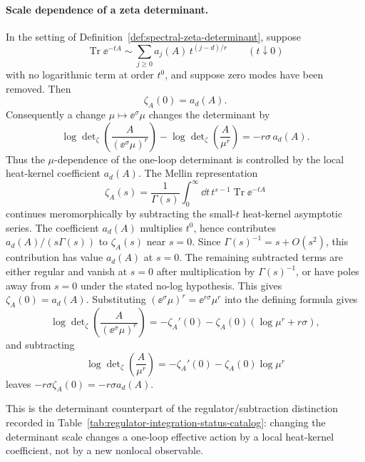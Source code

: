 \paragraph{Scale dependence of a zeta determinant.}
In the setting of Definition~\ref{def:spectral-zeta-determinant}, suppose
\[
  \operatorname{Tr}\ee^{-tA}
  \sim
  \sum_{j\ge0} a_j(A)\,t^{(j-d)/r}
  \qquad (t\downarrow0)
\]
with no logarithmic term at order \(t^0\), and suppose zero modes have been
removed.  Then
\[
  \zeta_A(0)=a_d(A).
\]
Consequently a change \(\mu\mapsto \ee^\sigma\mu\) changes the determinant by
\[
  \log\det\nolimits_\zeta\!\left(\frac{A}{(\ee^\sigma\mu)^r}\right)
  -
  \log\det\nolimits_\zeta\!\left(\frac{A}{\mu^r}\right)
  =
  -r\sigma\,a_d(A).
\]
Thus the \(\mu\)-dependence of the one-loop determinant is controlled by the
local heat-kernel coefficient \(a_d(A)\).
The Mellin representation
\[
  \zeta_A(s)=\frac1{\Gamma(s)}
  \int_0^\infty \dd t\,t^{s-1}\operatorname{Tr}\ee^{-tA}
\]
continues meromorphically by subtracting the small-\(t\) heat-kernel
asymptotic series.  The coefficient \(a_d(A)\) multiplies \(t^0\), hence
contributes \(a_d(A)/(s\Gamma(s))\) to \(\zeta_A(s)\) near \(s=0\).  Since
\(\Gamma(s)^{-1}=s+O(s^2)\), this contribution has value \(a_d(A)\) at
\(s=0\).  The remaining subtracted terms are either regular and vanish at
\(s=0\) after multiplication by \(\Gamma(s)^{-1}\), or have poles away from
\(s=0\) under the stated no-log hypothesis.  This gives
\(\zeta_A(0)=a_d(A)\).  Substituting
\((\ee^\sigma\mu)^r=\ee^{r\sigma}\mu^r\) into the defining formula gives
\[
  \log\det\nolimits_{\zeta}\left(\frac{A}{(\ee^\sigma\mu)^r}\right)
  =
  -\zeta_A'(0)-\zeta_A(0)(\log\mu^r+r\sigma),
\]
and subtracting
\[
  \log\det\nolimits_{\zeta}\left(\frac{A}{\mu^r}\right)
  =
  -\zeta_A'(0)-\zeta_A(0)\log\mu^r
\]
leaves \(-r\sigma\zeta_A(0)=-r\sigma a_d(A)\).

This is the determinant counterpart of the regulator/subtraction distinction
recorded in Table~\ref{tab:regulator-integration-status-catalog}: changing
the determinant scale changes a one-loop effective action by a local
heat-kernel coefficient, not by a new nonlocal observable.

